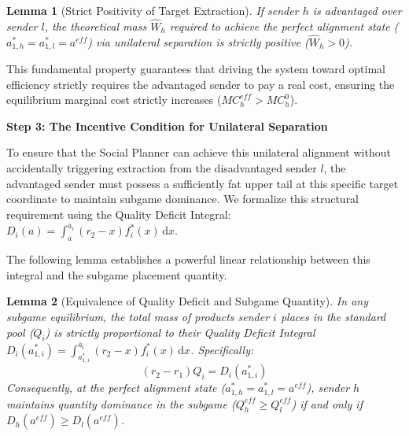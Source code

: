 \documentclass[12pt, a4paper]{article}
\newtheorem{lemma}{Lemma}
\begin{document}
\begin{lemma}[Strict Positivity of Target Extraction]
\label{Lemma: Positive Target Extraction}
If sender $h$ is advantaged over sender $l$, the theoretical mass $\hat{W}_h$ required to achieve the perfect alignment state ($a_{1,h}^* = a_{1,l}^* = a^{eff}$) via unilateral separation is strictly positive ($\hat{W}_h > 0$).
\end{lemma}

This fundamental property guarantees that driving the system toward optimal efficiency strictly requires the advantaged sender to pay a real cost, ensuring the equilibrium marginal cost strictly increases ($MC_h^{eff} > MC_h^0$).


\textbf{Step 3: The Incentive Condition for Unilateral Separation}

To ensure that the Social Planner can achieve this unilateral alignment without accidentally triggering extraction from the disadvantaged sender $l$, the advantaged sender must possess a sufficiently fat upper tail at this specific target coordinate to maintain subgame dominance. We formalize this structural requirement using the Quality Deficit Integral: $D_i(a) = \int_a^{\bar{a}_i} (r_2 - x) f_i^*(x) \, \mathrm{d}x$.

The following lemma establishes a powerful linear relationship between this integral and the subgame placement quantity.

\begin{lemma}[Equivalence of Quality Deficit and Subgame Quantity]
\label{Lemma: Quantity Equivalence}
    In any subgame equilibrium, the total mass of products sender $i$ places in the standard pool ($Q_i$) is strictly proportional to their Quality Deficit Integral $D_i(a_{1,i}^*) = \int_{a_{1,i}^*}^{\bar{a}_i} (r_2 - x) f_i^*(x) \, \mathrm{d}x$. Specifically:
    \[
        (r_2 - r_1)Q_i = D_i(a_{1,i}^*)
    \]
    Consequently, at the perfect alignment state ($a_{1,h}^* = a_{1,l}^* = a^{eff}$), sender $h$ maintains quantity dominance in the subgame ($Q_h^{eff} \ge Q_l^{eff}$) if and only if $D_h(a^{eff}) \ge D_l(a^{eff})$.
\end{lemma}
\end{document}
